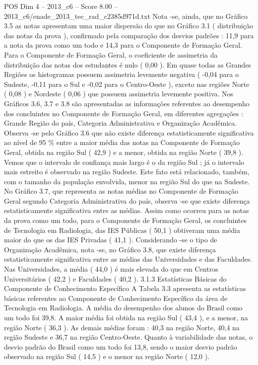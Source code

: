 \begin{textsample}{POS Dim 4 – 2013\_c6 – Score 8.00 – 2013\_c6/enade\_2013\_tec\_rad\_c2385d971d.txt}
Nota -se, ainda, que no Gráfico 3.5 as notas apresentam uma maior dispersão do que no Gráfico 3.1 ( distribuição das notas da prova ), confirmado pela comparação dos desvios padrões : 11,9 para a nota da prova como um todo e 14,3 para o Componente de Formação Geral.
Para o Componente de Formação Geral, o coeficiente de assimetria da distribuição das notas dos estudantes é nulo ( 0,00 ).
Em quase todas as Grandes Regiões os histogramas possuem assimetria levemente negativa ( -0,04 para o Sudeste, -0,11 para o Sul e -0,02 para o Centro-Oeste ), exceto nas regiões Norte ( 0,08 ) e Nordeste ( 0,06 ) que possuem assimetria levemente positiva.
Nos Gráficos 3.6, 3.7 e 3.8 são apresentadas as informações referentes ao desempenho dos concluintes no Componente de Formação Geral, em diferentes agregações : Grande Região do país, Categoria Administrativa e Organização Acadêmica.
Observa -se pelo Gráfico 3.6 que não existe diferença estatisticamente significativa ao nível de 95 \% entre a maior média das notas na Componente de Formação Geral, obtida na região Sul ( 42,9 ) e a menor, obtida na região Norte ( 39,8 ).
Vemos que o intervalo de confiança mais largo é o da região Sul ; já o intervalo mais estreito é observado na região Sudeste.
Este fato está relacionado, também, com o tamanho da população envolvida, menor na região Sul do que na Sudeste.
No Gráfico 3.7, que representa as notas médias no Componente de Formação Geral segundo Categoria Administrativa do país, observa -se que existe diferença estatisticamente significativa entre as médias.
Assim como ocorreu para as notas da prova como um todo, para o Componente de Formação Geral, os concluintes de Tecnologia em Radiologia, das IES Públicas ( 50,1 ) obtiveram uma média maior do que os das IES Privadas ( 41,1 ).
Considerando -se o tipo de Organização Acadêmica, nota -se, no Gráfico 3.8, que existe diferença estatisticamente significativa entre as médias das Universidades e das Faculdades.
Nas Universidades, a média ( 44,0 ) é mais elevada do que em Centros Universitários ( 42,2 ) e Faculdades ( 40,2 ). 3.1.3 Estatísticas Básicas do Componente de Conhecimento Específico A Tabela 3.3 apresenta as estatísticas básicas referentes ao Componente de Conhecimento Específico da área de Tecnologia em Radiologia.
A média do desempenho dos alunos do Brasil como um todo foi 39,8.
A maior média foi obtida na região Sul ( 43,4 ), e a menor, na região Norte ( 36,3 ).
As demais médias foram : 40,3 na região Norte, 40,4 na região Sudeste e 36,7 na região Centro-Oeste.
Quanto à variabilidade das notas, o desvio padrão do Brasil como um todo foi 13,8, sendo o maior desvio padrão observado na região Sul ( 14,5 ) e o menor na região Norte ( 12,0 ).

\end{textsample}
